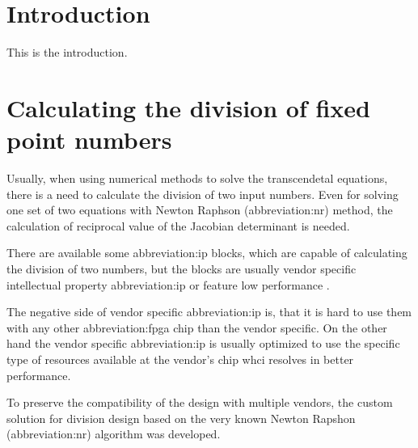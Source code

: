 \documentclass[a4paper, twoside, 11pt]{article}
\begin{document}


\tableofcontents
\newpage%
\flushbottom %
\newpage
\vspace{0pt}
\listoffigures %
\flushbottom %
\newpage
\listoftables
\flushbottom
\newpage


\null\newpage
\setcounter{page}{1}

\section{Introduction}
This is the introduction.

\flushbottom %
\newpage

\section{Calculating the division of fixed point numbers}\label{sec:calculating-the-division-of-fixed-point-numbers}
Usually, when using numerical methods to solve the transcendetal equations, there is a need to calculate the division of two input numbers. Even for solving one set of two equations with Newton Raphson (\gls{abbreviation:nr}) method, the calculation of reciprocal value of the Jacobian determinant is needed.\par
There are available some \gls{abbreviation:ip} blocks, which are capable of calculating the division of two numbers, but the blocks are usually vendor specific intellectual property \gls{abbreviation:ip} \cite{amd-xilinx-vivado-divider-ip-block} or feature low performance \cite{burke-fixed-point-math-library}.\par
The negative side of vendor specific \gls{abbreviation:ip} is, that it is hard to use them with any other \gls{abbreviation:fpga} chip than the vendor specific. On the other hand the vendor specific \gls{abbreviation:ip} is usually optimized to use the specific type of resources available at the vendor's chip whci resolves in better performance.\par
To preserve the compatibility of the design with multiple vendors, the custom solution for division design based on the very known Newton Rapshon (\gls{abbreviation:nr}) algorithm was developed. \cite{burke-fixed-point-math-library}
\end{document}
